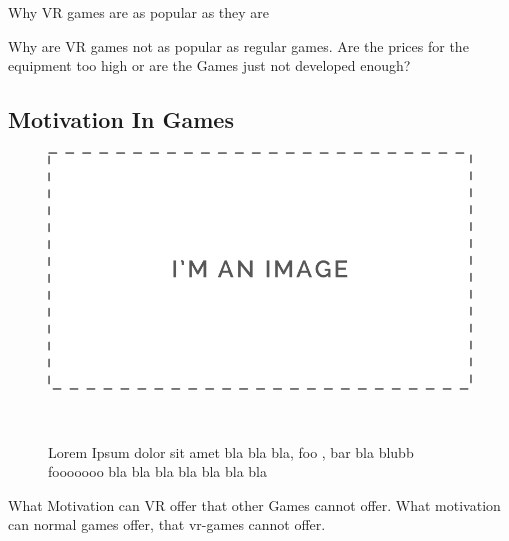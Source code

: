 Why VR games are as popular as they are

Why are VR games not as popular as regular games. Are the prices for the equipment too high or are the Games just not developed enough?


\subsection{Motivation In Games}

\begin{figure}
	\centering
	\includegraphics[width=0.9\columnwidth]{./figures/placeholder}
	\caption[blabla]{Lorem Ipsum dolor sit amet bla bla bla, foo , bar bla blubb fooooooo bla bla bla bla bla bla bla}~\label{fig:foobar3}
\end{figure}


What Motivation can VR offer that other Games cannot offer. What motivation can normal games offer, that vr-games cannot offer.

